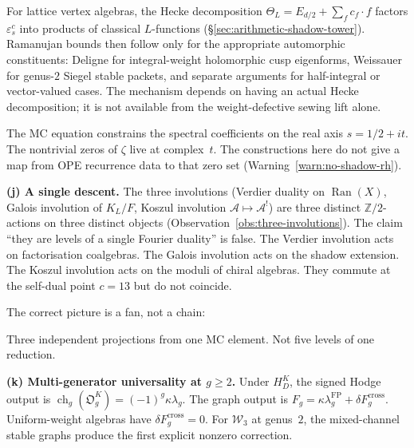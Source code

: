 \documentclass[11pt]{article}
\newcommand{\cA}{\mathcal{A}}
\newcommand{\cW}{\mathcal{W}}
\newcommand{\Z}{\mathbb{Z}}
\newcommand{\Ran}{\operatorname{Ran}}
\begin{document}
For lattice vertex algebras, the Hecke decomposition
$\Theta_L = E_{d/2} + \sum_f c_f \cdot f$ factors
$\varepsilon^c_s$ into products of classical $L$-functions
(\S\ref{sec:arithmetic-shadow-tower}).
Ramanujan bounds then follow only for the appropriate automorphic
constituents: Deligne for integral-weight holomorphic cusp
eigenforms, Weissauer for genus-$2$ Siegel stable packets, and
separate arguments for half-integral or vector-valued cases.  The
mechanism depends on having an actual Hecke decomposition; it is not
available from the weight-defective sewing lift alone.

The MC equation constrains the spectral coefficients on the
real axis $s = 1/2 + it$.  The nontrivial zeros of $\zeta$
live at complex~$t$.  The constructions here do not give a map
from OPE recurrence data to that zero set
(Warning~\ref{warn:no-shadow-rh}).

\medskip

\noindent\textbf{(j) A single descent.}\enspace
The three involutions (Verdier duality on $\Ran(X)$, Galois
involution of $K_L/F$, Koszul involution $\cA \mapsto \cA^!$)
are three distinct $\Z/2$-actions on three distinct objects
(Observation~\ref{obs:three-involutions}).  The claim ``they
are levels of a single Fourier duality'' is false.  The Verdier
involution acts on factorisation coalgebras.  The Galois
involution acts on the shadow extension.  The Koszul involution
acts on the moduli of chiral algebras.  They commute at the
self-dual point $c = 13$ but do not coincide.

The correct picture is a fan, not a chain:

\begin{center}
\end{center}

\noindent
Three independent projections from one MC element.  Not five
levels of one reduction.

\medskip

\noindent\textbf{(k) Multi-generator universality at
$g \geq 2$.}\enspace
Under $H_D^K$, the signed Hodge output is
$\operatorname{ch}_g(\mathfrak O_g^K)=(-1)^g\kappa\lambda_g$.
The graph output is
$F_g=\kappa\lambda_g^{\mathrm{FP}}+\delta F_g^{\mathrm{cross}}$.
Uniform-weight algebras have $\delta F_g^{\mathrm{cross}}=0$.
For $\cW_3$ at genus~$2$, the mixed-channel stable graphs produce
the first explicit nonzero correction.
\end{document}
